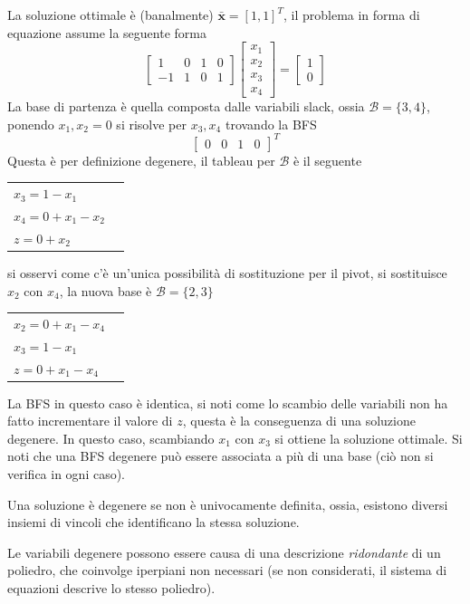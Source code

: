 \documentclass[10pt, letterpaper]{report}
\newcommand{\x}{{\mathbf{x}}}
\begin{document}
La soluzione ottimale è (banalmente) $\bar{\mathbf x}=[1,1]^T$, il problema in forma di equazione assume la seguente forma 
\begin{equation}
    \begin{bmatrix}
        1&0&1&0\\ 
        -1&1&0&1
    \end{bmatrix}\begin{bmatrix}
        x_1\\x_2\\x_3\\x_4
    \end{bmatrix}=\begin{bmatrix}
        1\\0
    \end{bmatrix}
\end{equation}
La base di partenza è quella composta dalle variabili slack, ossia $\mathcal B = \{3,4\}$, ponendo $x_1,x_2=0$ si risolve per $x_3,x_4$ trovando la BFS
$$ \begin{bmatrix}
    0 & 0 & 1 & 0
\end{bmatrix}^T$$
Questa è per definizione degenere, il tableau per $\mathcal B$ è il seguente 
\begin{center}
    \begin{tabular}{|l|l|}\hline 
        $x_3=1-x_1$\\ 
        $x_4=0+x_1-x_2$\\
        \hline 
        $z=0+x_2$ \\\hline 
    \end{tabular}
\end{center}
si osservi come c'è un'unica possibilità di sostituzione per il pivot, si sostituisce $x_2$ con $x_4$, la nuova base è $\mathcal B = \{2,3\}$ 
\begin{center}
    \begin{tabular}{|l|l|}\hline 
        $x_2=0+x_1-x_4$\\
        $x_3=1-x_1$\\ 
        \hline 
        $z=0+x_1-x_4$ \\\hline 
    \end{tabular}
\end{center}
La BFS in questo caso è identica, si noti come lo scambio delle variabili non ha fatto incrementare il valore di $z$, questa è la conseguenza di una soluzione degenere. In questo caso, scambiando $x_1$ con $x_3$ si ottiene la soluzione ottimale. Si noti che una BFS degenere può essere associata a più di una base (ciò non si verifica in ogni caso).
\begin{osservazione}
    Una soluzione è degenere se non è univocamente definita, ossia, esistono diversi insiemi di vincoli che identificano la stessa soluzione.
\end{osservazione}
Le variabili degenere possono essere causa di una descrizione \textit{ridondante} di un poliedro, che coinvolge iperpiani non necessari (se non considerati, il sistema di equazioni descrive lo stesso poliedro).
\end{document}
